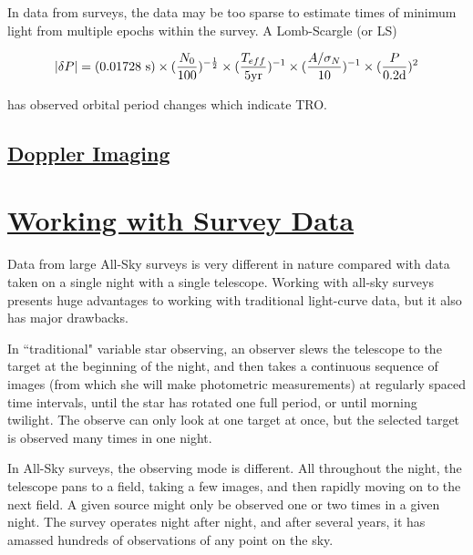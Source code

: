 \documentclass[12pt]{article} %
\numberwithin{equation}{section} %
\begin{document}
In data from surveys, the data may be too sparse to estimate times of minimum light from multiple epochs within the survey. A Lomb-Scargle (or LS) \citep{scargle1982studies}

\citep{horne1986prescription} 

\begin{equation} \label{eqn: horne_baliunas}
|\delta P| = (0.01728\text{ s}) \times (\frac{N_{0}}{100})^{-\frac{1}{2}} \times (\frac{T_{eff}}{5\text{yr}})^{-1} \\  \times (\frac{A/ \sigma_{N}}{10})^{-1} \times (\frac{P}{0.2\text{d}})^{2}
\end{equation}


\citet{qian2001orbital} has observed orbital period changes which indicate TRO. 

\subsection[Doppler Imaging]{\hyperlink{toc}{Doppler Imaging}} \label{sec: doppler_imaging}



\section[Working with Survey Data]{\hyperlink{toc}{Working with Survey Data}} \label{sec: Working with Survey Data}

Data from large All-Sky surveys is very different in nature compared with data taken on a single night with a single telescope. Working with all-sky surveys presents huge advantages to working with traditional light-curve data, but it also has major drawbacks.

In ``traditional" variable star observing, an observer slews the telescope to the target at the beginning of the night, and then takes a continuous sequence of images (from which she will make photometric measurements) at regularly spaced time intervals, until the star has rotated one full period, or until morning twilight. The observe can only look at one target at once, but the selected target is observed many times in one night.

In All-Sky surveys, the observing mode is different. All throughout the night, the telescope pans to a field, taking a few images, and then rapidly moving on to the next field. A given source might only be observed one or two times in a given night. The survey operates night after night, and after several years, it has amassed hundreds of observations of any point on the sky.
\end{document}
